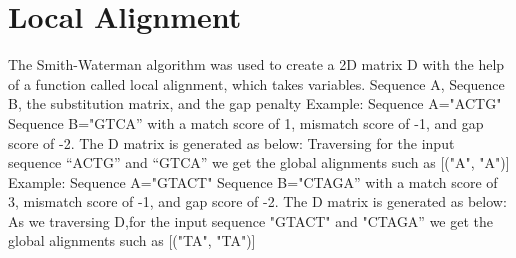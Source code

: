 \documentclass{article}
\begin{document}
\section{Local Alignment}
The Smith-Waterman algorithm was used to create a 2D matrix D with the help of a function called local alignment, which takes variables. Sequence A, Sequence B, the substitution matrix, and the gap penalty
\newline
\newline Example: Sequence A="ACTG"
Sequence B="GTCA” with a match score
of 1, mismatch score of -1, and gap score of -2.
\newline The D matrix is generated as below:
\newline [0 0 0 0 0]
\newline [0 0 0 0 1]
\newline [0 0 0 1 0]
\newline [0 0 1 0 0]
\newline [0 1 0 0 0]
\newline Traversing for the input sequence “ACTG” and “GTCA” we get the global alignments such as [("A", "A")]\newline 
\newline Example: Sequence A="GTACT" Sequence B="CTAGA” with a match score
of 3, mismatch score of -1, and gap score of -2.
\newline The D matrix is generated as below:
\newline [0 0 0 0 0 0]
\newline [0 0 0 0 1 0]
\newline [0 0 1 0 0 0]
\newline [0 0 0 2 0 1]
\newline [0 1 0 0 1 0]
\newline [0 0 2 0 0 0]
\newline
As we traversing D,for the input sequence "GTACT" and "CTAGA” we get the global alignments such as [("TA", "TA")]
 
\end{document}
